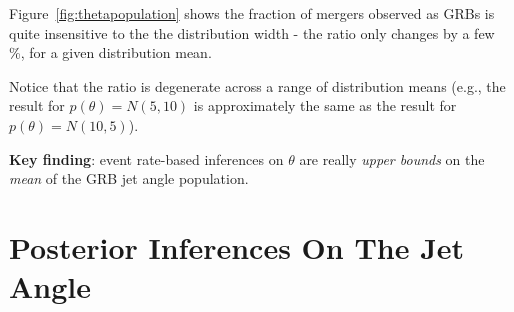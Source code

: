 \documentclass[a0,landscape]{a0poster}
\begin{document}
\begin{multicols}{4}

Figure~\ref{fig:thetapopulation} shows the fraction of mergers observed as GRBs
is quite insensitive to the the distribution width - the ratio only changes by a
few \%, for a given distribution mean.
 
Notice that the ratio is degenerate across a range of distribution means (e.g.,
the result for $p(\theta) = N(5,10)$ is approximately the same as the result for
$p(\theta) = N(10,5)$).  

{\bf Key finding}: event rate-based inferences on $\theta$ are really \emph{upper
bounds} on the \emph{mean} of the GRB jet angle population.



\section*{\centering Posterior Inferences On The Jet Angle}


\end{multicols}
\end{document}
